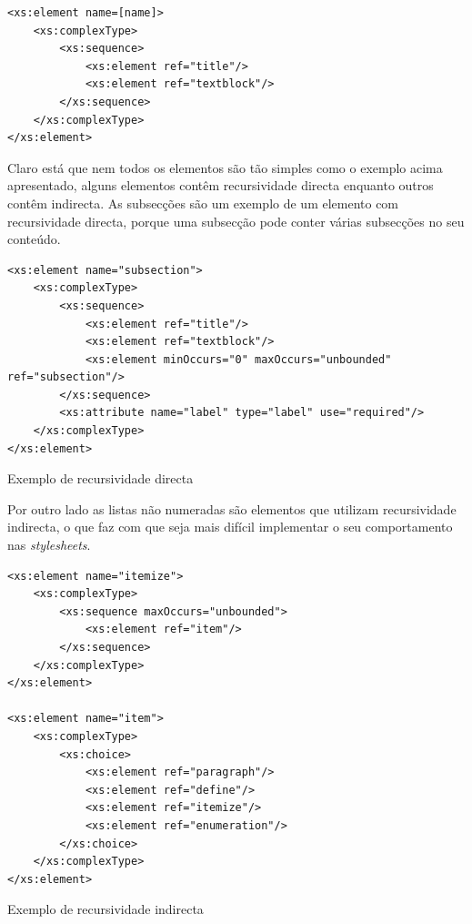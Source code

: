 \documentclass[a4paper]{article}
\begin{document}
\begin{small}
\begin{lstlisting}
<xs:element name=[name]>
    <xs:complexType>
        <xs:sequence>
            <xs:element ref="title"/>
            <xs:element ref="textblock"/>
        </xs:sequence>
    </xs:complexType>
</xs:element>
\end{lstlisting}
\end{small}

\hspace{1cm}Claro está que nem todos os elementos são tão simples como o exemplo acima apresentado, alguns elementos contêm recursividade directa enquanto outros contêm indirecta. As subsecções são um exemplo de um elemento com recursividade directa, porque uma subsecção pode conter várias subsecções no seu conteúdo.\\

\begin{small}
\begin{lstlisting}
<xs:element name="subsection">
    <xs:complexType>
        <xs:sequence>
            <xs:element ref="title"/>
            <xs:element ref="textblock"/>
            <xs:element minOccurs="0" maxOccurs="unbounded" ref="subsection"/>
        </xs:sequence>
        <xs:attribute name="label" type="label" use="required"/>
    </xs:complexType>
</xs:element>
\end{lstlisting}
\begin{center}
\begin{footnotesize}
\caption{Exemplo de recursividade directa}
\end{footnotesize}
\end{center}
\end{small}

Por outro lado as listas não numeradas são elementos que utilizam recursividade indirecta, o que faz com que seja mais difícil implementar o seu comportamento nas \emph{stylesheets}.\\

\begin{small}
\begin{lstlisting}
<xs:element name="itemize">
    <xs:complexType>
        <xs:sequence maxOccurs="unbounded">
            <xs:element ref="item"/>
        </xs:sequence>
    </xs:complexType>
</xs:element>

<xs:element name="item">
    <xs:complexType>
        <xs:choice>
            <xs:element ref="paragraph"/>
            <xs:element ref="define"/>
            <xs:element ref="itemize"/>
            <xs:element ref="enumeration"/>
        </xs:choice>
    </xs:complexType>
</xs:element>
\end{lstlisting}
\begin{center}
\begin{footnotesize}
\caption{Exemplo de recursividade indirecta}
\end{footnotesize}
\end{center}
\end{small}
\end{document}
